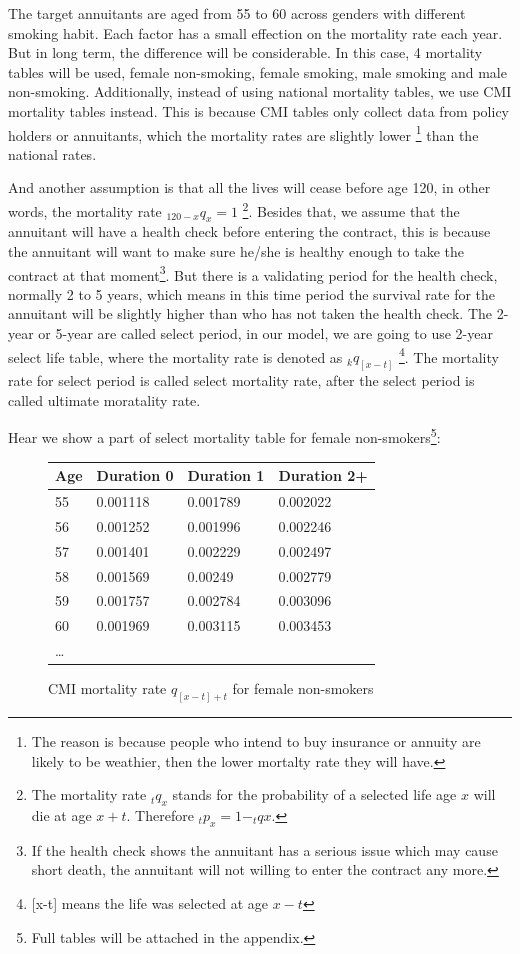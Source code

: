 \documentclass{report}
\begin{document}
The target annuitants are aged from 55 to 60 across genders with different smoking habit. Each factor has a small effection on the mortality rate each year. But in long term, the difference will be considerable. In this case, 4 mortality tables will be used, female non-smoking, female smoking, male smoking and male non-smoking. Additionally, instead of using national mortality tables, we use CMI mortality tables instead. This is because CMI tables only collect data from policy holders or annuitants, which the mortality rates are slightly lower \footnote{The reason is because people who intend to buy insurance or annuity are likely to be weathier, then the lower mortalty rate they will have.} than the national rates.



And another assumption is that all the lives will cease before age 120, in other words, the mortality rate $_{120-x}q_{x}=1$ \footnote{The mortality rate $_tq_{x}$ stands for the probability of a selected life age $x$ will die at age $x+t$. Therefore $_tp_{x} = 1- _tq{x}$.}. Besides that, we assume that the annuitant will have a health check before entering the contract, this is because the annuitant will want to make sure he/she is healthy enough to take the contract at that moment\footnote{If the health check shows the annuitant has a serious issue which may cause short death, the annuitant will not willing to enter the contract any more.}. But there is a validating period for the health check, normally 2 to 5 years, which means in this time period the survival rate for the annuitant will be slightly higher than who has not taken the health check. The 2-year or 5-year are called select period, in our model, we are going to use 2-year select life table, where the mortality rate is denoted as $_kq_{[x-t]}$ \footnote{[x-t] means the life was selected at age $x-t$}. The mortality rate for select period is called select mortality rate, after the select period is called ultimate moratality rate.

Hear we show a part of select mortality table for female non-smokers\footnote{Full tables will be attached in the appendix.}:



\begin{figure}[H]
    \centering
\begin{tabular}{p{2cm}p{2cm}p{2cm}p{2cm}}
Age              & Duration 0 & Duration 1 & Duration 2+    \\
\hline
55&0.001118&0.001789&0.002022    \\
56&0.001252&0.001996&0.002246  \\
57&0.001401&0.002229&0.002497\\
58&0.001569&0.00249&0.002779\\
59&0.001757&0.002784&0.003096\\
60&0.001969&0.003115&0.003453\\
\dots
\end{tabular}
\caption{CMI mortality rate $q_{[x-t]+t}$ for female non-smokers}
\end{figure}
\end{document}
